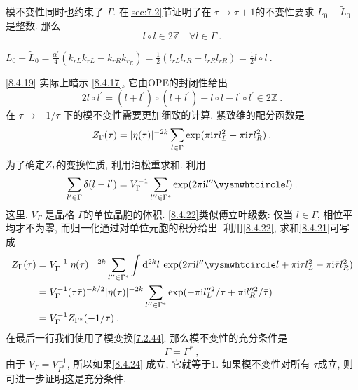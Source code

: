 模不变性同时也约束了 $\Gamma $. 在\ref{sec:7.2}节证明了在 $\tau \rightarrow \tau+1$的不变性要求 $L_{0}-\tilde{L}_{0}$是整数. 那么
\begin{equation}
	l \vysmwhtcircle l \in 2 \mathds{Z} \quad \forall l \in \Gamma \:. \label{8.4.19}
\end{equation}
\begin{tcolorbox}
	\begin{remark}
		$
		L_0-\tilde{L}_0=\frac{\alpha^{\prime}}{4}(k_{r L} k_{r L}-k_{r R} k_{r_{R}})
		=\frac{1}{2}(l_{rL}l_{r R}-l_{r R} l_{rR})=\frac{1}{2} l \vysmwhtcircle l \:.
		$
	\end{remark}
\end{tcolorbox}
\noindent \eqref{8.4.19} 实际上暗示 \eqref{8.4.17}, 它由OPE的封闭性给出
\begin{equation}
	2 l \vysmwhtcircle l^{\prime}=(l+l^{\prime}) \vysmwhtcircle (l+l^{\prime})-l \vysmwhtcircle l-l^{\prime} \vysmwhtcircle l^{\prime} \in 2 \mathds{Z} \:. \label{8.4.20}
\end{equation}
在 $\tau \rightarrow-1 / \tau$ 下的模不变性需要更加细致的计算. 紧致维的配分函数是
\begin{equation}
	Z_{\Gamma}(\tau)=|\eta(\tau)|^{-2 k} \sum_{l \in \Gamma} \exp (\pi \mathrm{i} \tau l_{L}^{2}-\pi \mathrm{i} \tau l_{R}^{2}) \:. \label{8.4.21}
\end{equation}
为了确定$Z_{\Gamma}$的变换性质, 利用泊松重求和. 利用
\begin{equation}
	\sum_{l^{\prime} \in \Gamma} \delta(l-l^{\prime})=V_{\Gamma}^{-1} \sum_{l^{\prime \prime} \in \Gamma^{*}} 
	\exp (2 \pi \mi l^{\prime \prime}  \vysmwhtcircle l) \:. \label{8.4.22}
\end{equation}
这里, $V_{\Gamma}$ 是晶格 $\Gamma$的单位晶胞的体积. \eqref{8.4.22}类似傅立叶级数: 仅当 $l \in \Gamma$, 相位平均才不为零, 而归一化通过对单位元胞的积分给出. 利用\eqref{8.4.22}, 求和\eqref{8.4.21}可写成
\begin{align}
	Z_{\Gamma}(\tau) &=V_{\Gamma}^{-1}|\eta(\tau)|^{-2 k} \sum_{l^{\prime \prime} \in \Gamma^{*}} 
	\int \dif^{2 k} l \: \exp (2 \pi \mi l^{\prime \prime} \vysmwhtcircle l+ \pi \mi \tau l_{L}^{2} 
	-\pi \mi \bar{\tau} l_{R}^{2}) \nonumber \\
	&=V_{\Gamma}^{-1}(\tau \bar{\tau})^{-k / 2}|\eta(\tau)|^{-2 k} \sum_{l^{\prime \prime} \in \Gamma^{*}} 
	\exp (-\pi \mi l_{L}^{\prime \prime 2} / \tau+\pi \mi l_{R}^{\prime \prime 2} / \bar{\tau}) \nonumber \\
	&=V_{\Gamma}^{-1} Z_{\Gamma^{*}}(-1 / \tau) \:, \label{8.4.23}
\end{align}
在最后一行我们使用了模变换\eqref{7.2.44}. 那么模不变性的充分条件是
\begin{equation}
	\Gamma=\Gamma^{*} \:, \label{8.4.24}
\end{equation}
由于 $V_{\Gamma}=V_{\Gamma^{*}}^{-1}$, 所以如果\eqref{8.4.24} 成立, 它就等于1. 如果模不变性对所有 $\tau$成立, 则可进一步证明这是充分条件.

